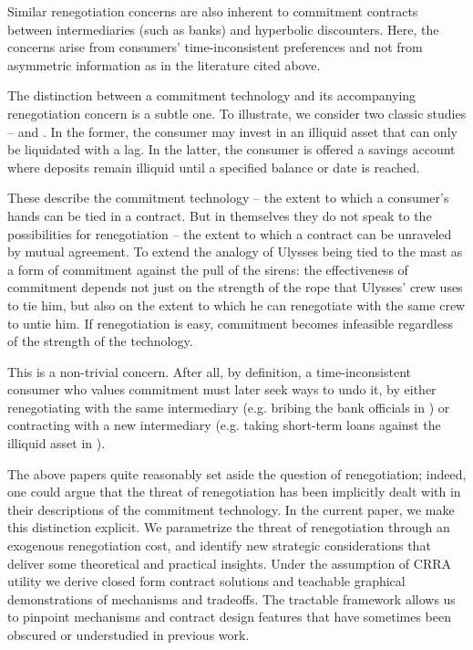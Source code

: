 \documentclass[11pt,english]{article}
\theoremstyle{plain}
\theoremstyle{definition}
\begin{document}
Similar renegotiation concerns are also inherent to commitment contracts between intermediaries (such as banks) and hyperbolic discounters. Here, the concerns arise from consumers' time-inconsistent preferences and not from asymmetric information as in the literature cited above. 

The distinction between a commitment technology and its accompanying renegotiation concern is a subtle one. To illustrate, we consider two classic studies --  \citet{laibson1997} and \citet{ashraf2006}. In the former, the consumer may invest in an illiquid asset that can only be liquidated with a lag. In the latter, the consumer is offered a savings account where deposits remain illiquid until a specified balance or date is reached.

These describe the commitment technology -- the extent to which a consumer's hands can be tied in a contract. But in themselves they do not speak to the possibilities for renegotiation -- the extent to which a contract can be unraveled by mutual agreement. To extend the \citet{ashraf2006} analogy of Ulysses being tied to the mast as a form of commitment against the pull of the sirens: the effectiveness of commitment depends not just on the strength of the rope that Ulysses' crew uses to tie him, but also on the extent to which he can renegotiate with the same crew to untie him. If renegotiation is easy, commitment becomes infeasible regardless of the strength of the technology.

This is a non-trivial concern. After all, by definition, a time-inconsistent consumer who values commitment must later seek ways to undo it, by either renegotiating with the same intermediary (e.g. bribing the bank officials in \citealp{ashraf2006}) or contracting with a new intermediary (e.g. taking short-term loans against the illiquid asset in \citealp{laibson1997}).


The above papers quite reasonably set aside the question of renegotiation; indeed, one could argue that the threat of renegotiation has been implicitly dealt with in their descriptions of the commitment technology. In the current paper, we make this distinction explicit. We parametrize the threat of renegotiation through an exogenous renegotiation cost, and identify new strategic considerations that deliver some theoretical and practical insights. Under the assumption of CRRA utility we derive closed form contract solutions and teachable graphical demonstrations of mechanisms and tradeoffs. The tractable framework allows us to pinpoint mechanisms and contract design features that have sometimes been obscured or understudied in previous work.
\end{document}
